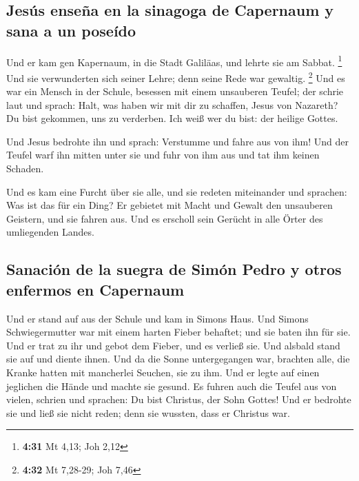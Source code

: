 \hypertarget{jesuxfas-enseuxf1a-en-la-sinagoga-de-capernaum-y-sana-a-un-poseuxeddo}{%
\subsection{Jesús enseña en la sinagoga de Capernaum y sana a un
poseído}\label{jesuxfas-enseuxf1a-en-la-sinagoga-de-capernaum-y-sana-a-un-poseuxeddo}}

 Und er kam gen Kapernaum, in die Stadt Galiläas, und
lehrte sie am Sabbat. \footnote{\textbf{4:31} Mt 4,13; Joh 2,12}
 Und sie verwunderten sich seiner Lehre; denn seine Rede
war gewaltig. \footnote{\textbf{4:32} Mt 7,28-29; Joh 7,46}
 Und es war ein Mensch in der Schule, besessen mit einem
unsauberen Teufel; der schrie laut  und sprach: Halt, was
haben wir mit dir zu schaffen, Jesus von Nazareth? Du bist gekommen, uns
zu verderben. Ich weiß wer du bist: der heilige Gottes.

 Und Jesus bedrohte ihn und sprach: Verstumme und fahre
aus von ihm! Und der Teufel warf ihn mitten unter sie und fuhr von ihm
aus und tat ihm keinen Schaden.

 Und es kam eine Furcht über sie alle, und sie redeten
miteinander und sprachen: Was ist das für ein Ding? Er gebietet mit
Macht und Gewalt den unsauberen Geistern, und sie fahren aus.
 Und es erscholl sein Gerücht in alle Örter des
umliegenden Landes.

\hypertarget{sanaciuxf3n-de-la-suegra-de-simuxf3n-pedro-y-otros-enfermos-en-capernaum}{%
\subsection{Sanación de la suegra de Simón Pedro y otros enfermos en
Capernaum}\label{sanaciuxf3n-de-la-suegra-de-simuxf3n-pedro-y-otros-enfermos-en-capernaum}}

 Und er stand auf aus der Schule und kam in Simons Haus.
Und Simons Schwiegermutter war mit einem harten Fieber behaftet; und sie
baten ihn für sie.  Und er trat zu ihr und gebot dem
Fieber, und es verließ sie. Und alsbald stand sie auf und diente ihnen.
 Und da die Sonne untergegangen war, brachten alle, die
Kranke hatten mit mancherlei Seuchen, sie zu ihm. Und er legte auf einen
jeglichen die Hände und machte sie gesund.  Es fuhren
auch die Teufel aus von vielen, schrien und sprachen: Du bist Christus,
der Sohn Gottes! Und er bedrohte sie und ließ sie nicht reden; denn sie
wussten, dass er Christus war.

